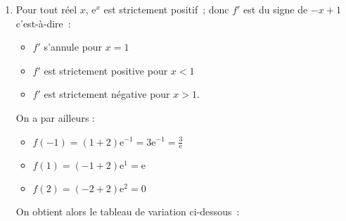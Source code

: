 \begin{corrige}
\begin{enumerate}
\begin{enumerate}[label=\alph*.]
               \item
               Pour tout réel $x$,  $\text{e}^{ x }$ est strictement positif~; donc $f' $ est du signe de  $ - x+1$ c'est-à-dire~:
               \begin{itemize}
                    \item
                    $f' $ s'annule pour $x=1$
                    \item
                    $f' $ est strictement positive pour $x < 1$
                    \item
                    $f' $ est strictement négative pour $x > 1. $
               \end{itemize}
               \newpar
               On a par ailleurs :
               \begin{itemize}
                    \item
                    $f(  - 1 )=( 1+2 )\text{e}^{  - 1 }=3\text{e}^{  - 1 }=\frac{ 3 }{ \text{e} }$
                    \item
                    $f( 1 )=(  - 1+2 )\text{e}^{ 1 }=\text{e}$
                    \item
                    $f( 2)=(  - 2 +2)\text{e}^{ 2 }=0$
               \end{itemize}
               \newpar
               On obtient alors le tableau de variation ci-dessous~:\\
               \begin{center}
                    \begin{extern}%
\end{extern}
\end{center}
\end{enumerate}
\end{enumerate}
\end{corrige}
